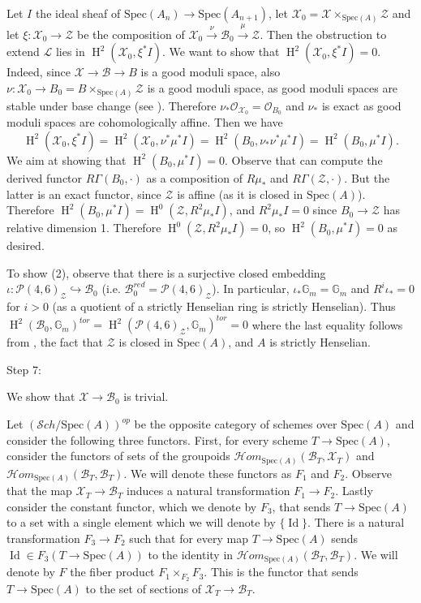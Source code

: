 \documentclass[11pt]{amsart}
\theoremstyle{definition}
\theoremstyle{remark}
\newcommand{\calO}{\mathcal O}
\newcommand{\calH}{\mathcal H}
\newcommand{\calB}{\mathcal B}
\newcommand{\calL}{\mathcal L}
\newcommand{\calX}{\mathcal X}
\newcommand{\calP}{\mathcal P}
\newcommand{\calZ}{\mathcal Z}
\newcommand{\sS}{\mathscr{S}}
\newcommand{\bG}{\mathbb{G}}
\newcommand{\Spec}{\mathrm{Spec}}
\newcommand{\oH}{\operatorname{H}}
\begin{document}
Let $I$ the ideal sheaf of $\Spec(A_n)\to \Spec(A_{n+1})$, let $\calX_0 = \calX\times_{\Spec(A)}\calZ$ and let $\xi:\calX_0\to \calZ$ be the composition of $\calX_0 \xrightarrow{\nu} \calB_0 \xrightarrow{\mu} \calZ$. Then the obstruction to extend $\calL$ lies in $\oH^2(\calX_0,\xi^*I)$. We want to show that $\oH^2(\calX_0,\xi^*I)=0$.
Indeed, since $\calX\to \calB\to B$ is a good moduli space, also $\nu:\calX_0\to B_0 = B\times_{\Spec(A)}\calZ$ is a good moduli space, as good moduli spaces are stable under base change (see \cite[Proposition 4.7]{GMS_jarod}). 
Therefore $\nu_*\calO_{\calX_0} = \calO_{B_0}$ and $\nu_*$ is exact as good moduli spaces are cohomologically affine. Then we have 
$$\oH^2(\calX_0,\xi^*I)=\oH^2(\calX_0,\nu^*\mu^*I) =\oH^2(B_0,\nu_*\nu^*\mu^*I) =\oH^2(B_0,\mu^*I).$$
We aim at showing that $\oH^2(B_0,\mu^*I)=0$. Observe that can compute the derived functor $R\Gamma(B_0,\cdot)$ as a composition of $R\mu_*$ and $R\Gamma(\calZ,\cdot)$. But the latter is an exact functor, since  $\calZ$ is affine (as it is closed in $\Spec(A)$). Therefore $\oH^2(B_0,\mu^*I) = \oH^0(\calZ, R^2\mu_*I)$, and $R^2\mu_*I=0$ since $B_0\to \calZ$ has relative dimension 1. Therefore $\oH^0(\calZ, R^2\mu_*I) = 0$, so $\oH^2(B_0,\mu^*I)=0$ as desired.

To show (2), observe that there is a surjective closed embedding $\iota:\calP(4,6)_{\calZ}\hookrightarrow \calB_0$ (i.e. $\calB_0^{red} = \calP(4,6)_{\calZ}$). In particular, $\iota_*\bG_m = \bG_m$ and $R^i\iota_* = 0$ for $i>0$ (as a quotient of a strictly Henselian ring is strictly Henselian). Thus $\oH^2(\calB_0, \bG_m)^{tor} = \oH^2(\calP(4,6)_{\calZ}, \bG_m)^{tor} = 0$ where the last equality follows from \cite{Minseon}, the fact that $\calZ$ is closed in $\Spec(A)$, and $A$ is strictly Henselian.


\begin{bf}Step 7:\end{bf}
We show that $\calX\to \calB_0$ is trivial.

Let $(\sS ch/\Spec(A))^{op}$ be the opposite category of schemes over $\Spec(A)$ and consider the following three functors.
First, for every scheme $T\to \Spec(A)$, consider the functors of sets of the groupoids $\calH om_{\Spec(A)}(\calB_T, \calX_T)$ and $\calH om_{\Spec(A)}(\calB_T, \calB_T)$. We will denote these functors as $F_1$ and $F_2$. Observe that the map $\calX_T\to \calB_T$ induces a natural transformation $F_1\to F_2$. Lastly consider the constant functor, which we denote by $F_3$, that sends $T\to \Spec(A)$ to a set with a single element which we will denote by $\{\operatorname{Id}\}$. There is a natural transformation $F_3\to F_2$ such that for every map $T\to \Spec(A)$ sends $\operatorname{Id} \in F_3(T\to \Spec(A))$ to the identity in $\calH om_{\Spec(A)}(\calB_T, \calB_T)$. We will denote by $F$ the fiber product $F_1\times_{F_2}F_3$. This is the functor that sends $T\to \Spec(A)$ to the set of sections of $\calX_T\to \calB_T$.
\end{document}
